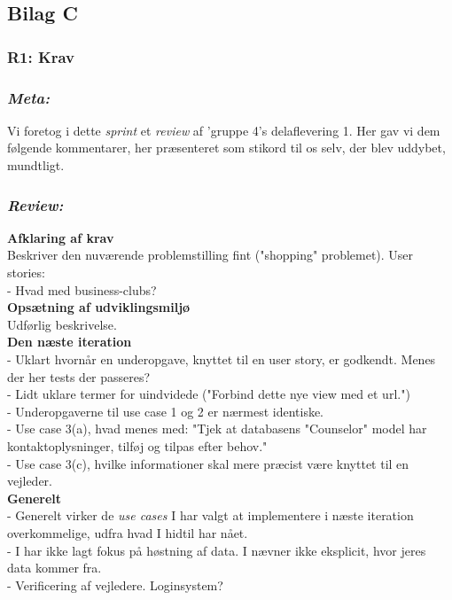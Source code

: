 \documentclass[12pt]{article}
\begin{document}
\subsection{Bilag C}
\label{sec:bilagC}
\subsubsection{R1: Krav}

\subsubsection*{\textit{Meta:}}
Vi foretog i dette \textit{sprint} et \textit{review} af 'gruppe 4's delaflevering 1. Her gav vi dem følgende kommentarer, her præsenteret som stikord til os selv, der blev uddybet, mundtligt.

\subsubsection*{\textit{Review:}}
\textbf{Afklaring af krav} \\
Beskriver den nuværende problemstilling fint ("shopping" problemet).
User stories: \\
- Hvad med business-clubs?\\
\textbf{Opsætning af udviklingsmiljø} \\
Udførlig beskrivelse.\\
\textbf{Den næste iteration} \\
- Uklart hvornår en underopgave, knyttet til en user story, er godkendt. Menes der her tests der passeres? \\
- Lidt uklare termer for uindvidede ("Forbind dette nye view med et url.") \\
- Underopgaverne til use case 1 og 2 er nærmest identiske. \\
- Use case 3(a), hvad menes med: "Tjek at databasens "Counselor" model har \\ kontaktoplysninger, tilføj og tilpas efter behov." \\
- Use case 3(c), hvilke informationer skal mere præcist være knyttet til en vejleder.\\
\textbf{Generelt} \\
- Generelt virker de \textit{use cases} I har valgt at implementere i næste iteration overkommelige, udfra hvad I hidtil har nået. \\
- I har ikke lagt fokus på høstning af data. I nævner ikke eksplicit, hvor jeres data kommer fra. \\
- Verificering af vejledere. Loginsystem?
\end{document}
